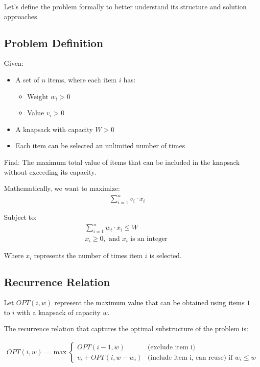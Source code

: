 \documentclass{article}
\begin{document}
Let's define the problem formally to better understand its structure and solution approaches.

\subsection{Problem Definition}

Given:
\begin{itemize}[leftmargin=*]
    \item A set of $n$ items, where each item $i$ has:
    \begin{itemize}
        \item Weight $w_i > 0$
        \item Value $v_i > 0$
    \end{itemize}
    \item A knapsack with capacity $W > 0$
    \item Each item can be selected an unlimited number of times
\end{itemize}

Find: The maximum total value of items that can be included in the knapsack without exceeding its capacity.

Mathematically, we want to maximize:
\begin{align}
\sum_{i=1}^{n} v_i \cdot x_i
\end{align}

Subject to:
\begin{align}
\sum_{i=1}^{n} w_i \cdot x_i \leq W \\
x_i \geq 0, \text{ and } x_i \text{ is an integer }
\end{align}

Where $x_i$ represents the number of times item $i$ is selected.

\subsection{Recurrence Relation}

Let $OPT(i, w)$ represent the maximum value that can be obtained using items $1$ to $i$ with a knapsack of capacity $w$.

The recurrence relation that captures the optimal substructure of the problem is:

\begin{align}
OPT(i, w) = \max 
\begin{cases} 
OPT(i-1, w) & \text{(exclude item i)} \\
v_i + OPT(i, w-w_i) & \text{(include item i, can reuse)} \text{ if } w_i \leq w
\end{cases}
\end{align}
\end{document}
